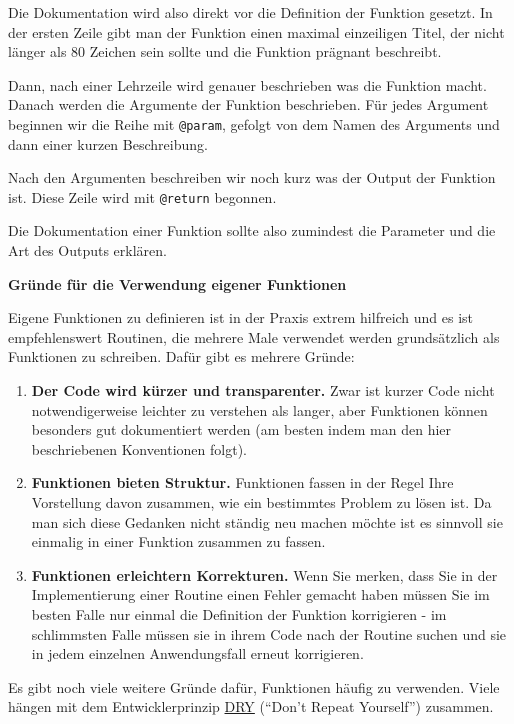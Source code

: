 \documentclass[]{book}
\providecommand{\tightlist}{%
  \setlength{\itemsep}{0pt}\setlength{\parskip}{0pt}}
\begin{document}
Die Dokumentation wird also direkt vor die Definition der Funktion
gesetzt. In der ersten Zeile gibt man der Funktion einen maximal
einzeiligen Titel, der nicht länger als 80 Zeichen sein sollte und die
Funktion prägnant beschreibt.

Dann, nach einer Lehrzeile wird genauer beschrieben was die Funktion
macht. Danach werden die Argumente der Funktion beschrieben. Für jedes
Argument beginnen wir die Reihe mit \texttt{@param}, gefolgt von dem
Namen des Arguments und dann einer kurzen Beschreibung.

Nach den Argumenten beschreiben wir noch kurz was der Output der
Funktion ist. Diese Zeile wird mit \texttt{@return} begonnen.

Die Dokumentation einer Funktion sollte also zumindest die Parameter und
die Art des Outputs erklären.

\textbf{Gründe für die Verwendung eigener Funktionen}

Eigene Funktionen zu definieren ist in der Praxis extrem hilfreich und
es ist empfehlenswert Routinen, die mehrere Male verwendet werden
grundsätzlich als Funktionen zu schreiben. Dafür gibt es mehrere Gründe:

\begin{enumerate}
\def\labelenumi{\arabic{enumi}.}
\tightlist
\item
  \textbf{Der Code wird kürzer und transparenter.} Zwar ist kurzer Code
  nicht notwendigerweise leichter zu verstehen als langer, aber
  Funktionen können besonders gut dokumentiert werden (am besten indem
  man den hier beschriebenen Konventionen folgt).
\item
  \textbf{Funktionen bieten Struktur.} Funktionen fassen in der Regel
  Ihre Vorstellung davon zusammen, wie ein bestimmtes Problem zu lösen
  ist. Da man sich diese Gedanken nicht ständig neu machen möchte ist es
  sinnvoll sie einmalig in einer Funktion zusammen zu fassen.
\item
  \textbf{Funktionen erleichtern Korrekturen.} Wenn Sie merken, dass Sie
  in der Implementierung einer Routine einen Fehler gemacht haben müssen
  Sie im besten Falle nur einmal die Definition der Funktion korrigieren
  - im schlimmsten Falle müssen sie in ihrem Code nach der Routine
  suchen und sie in jedem einzelnen Anwendungsfall erneut korrigieren.
\end{enumerate}

Es gibt noch viele weitere Gründe dafür, Funktionen häufig zu verwenden.
Viele hängen mit dem Entwicklerprinzip
\href{https://de.wikipedia.org/wiki/Don\%E2\%80\%99t_repeat_yourself}{DRY}
(``Don't Repeat Yourself'') zusammen.
\end{document}
